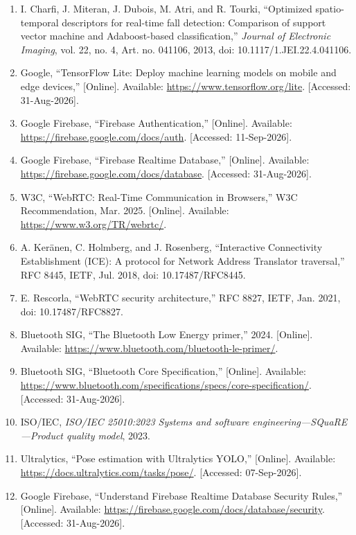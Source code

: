 \begin{enumerate}
    \item \label{ref:le2i} I. Charfi, J. Miteran, J. Dubois, M. Atri, and R. Tourki, ``Optimized spatio-temporal descriptors for real-time fall detection: Comparison of support vector machine and Adaboost-based classification,'' \textit{Journal of Electronic Imaging}, vol. 22, no. 4, Art. no. 041106, 2013, doi: 10.1117/1.JEI.22.4.041106.
    \item \label{ref:tflite} Google, ``TensorFlow Lite: Deploy machine learning models on mobile and edge devices,'' [Online]. Available: \url{https://www.tensorflow.org/lite}. [Accessed: 31-Aug-2026].
    \item \label{ref:firebase_auth} Google Firebase, ``Firebase Authentication,'' [Online]. Available: \url{https://firebase.google.com/docs/auth}. [Accessed: 11-Sep-2026].
    \item \label{ref:firebase_rtdb} Google Firebase, ``Firebase Realtime Database,'' [Online]. Available: \url{https://firebase.google.com/docs/database}. [Accessed: 31-Aug-2026].
    \item \label{ref:webrtc} W3C, ``WebRTC: Real-Time Communication in Browsers,'' W3C Recommendation, Mar. 2025. [Online]. Available: \url{https://www.w3.org/TR/webrtc/}.
    \item \label{ref:ice} A. Keränen, C. Holmberg, and J. Rosenberg, ``Interactive Connectivity Establishment (ICE): A protocol for Network Address Translator traversal,'' RFC 8445, IETF, Jul. 2018, doi: 10.17487/RFC8445.
    \item \label{ref:webrtc_security} E. Rescorla, ``WebRTC security architecture,'' RFC 8827, IETF, Jan. 2021, doi: 10.17487/RFC8827.
    \item \label{ref:ble_primer} Bluetooth SIG, ``The Bluetooth Low Energy primer,'' 2024. [Online]. Available: \url{https://www.bluetooth.com/bluetooth-le-primer/}.
    \item \label{ref:ble_core} Bluetooth SIG, ``Bluetooth Core Specification,'' [Online]. Available: \url{https://www.bluetooth.com/specifications/specs/core-specification/}. [Accessed: 31-Aug-2026].
    \item \label{ref:iso25010} ISO/IEC, \textit{ISO/IEC 25010:2023 Systems and software engineering---SQuaRE---Product quality model}, 2023.
    \item \label{ref:yolo_pose_docs} Ultralytics, ``Pose estimation with Ultralytics YOLO,'' [Online]. Available: \url{https://docs.ultralytics.com/tasks/pose/}. [Accessed: 07-Sep-2026].
    \item \label{ref:firebase_security} Google Firebase, ``Understand Firebase Realtime Database Security Rules,'' [Online]. Available: \url{https://firebase.google.com/docs/database/security}. [Accessed: 31-Aug-2026].

\end{enumerate}
